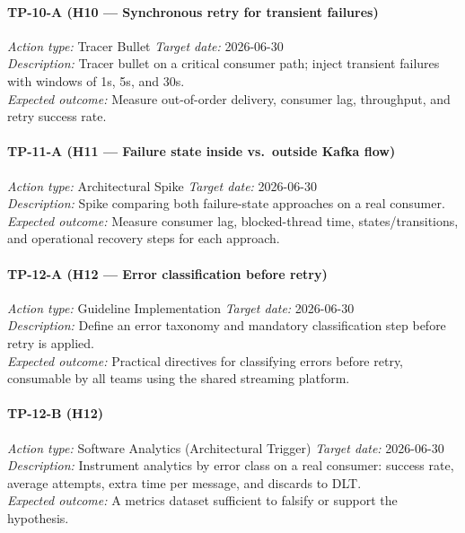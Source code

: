 \paragraph{TP-10-A \textnormal{(H10 — Synchronous retry for transient failures)}}
\textit{Action type:} Tracer Bullet \quad \textit{Target date:} 2026-06-30 \\
\textit{Description:} Tracer bullet on a critical consumer path; inject
transient failures with windows of 1s, 5s, and 30s. \\
\textit{Expected outcome:} Measure out-of-order delivery, consumer lag,
throughput, and retry success rate.

\paragraph{TP-11-A \textnormal{(H11 — Failure state inside vs.\ outside Kafka flow)}}
\textit{Action type:} Architectural Spike \quad \textit{Target date:} 2026-06-30 \\
\textit{Description:} Spike comparing both failure-state approaches on a real
consumer. \\
\textit{Expected outcome:} Measure consumer lag, blocked-thread time,
states/transitions, and operational recovery steps for each approach.

\paragraph{TP-12-A \textnormal{(H12 — Error classification before retry)}}
\textit{Action type:} Guideline Implementation \quad \textit{Target date:} 2026-06-30 \\
\textit{Description:} Define an error taxonomy and mandatory classification step
before retry is applied. \\
\textit{Expected outcome:} Practical directives for classifying errors before
retry, consumable by all teams using the shared streaming platform.

\paragraph{TP-12-B \textnormal{(H12)}}
\textit{Action type:} Software Analytics (Architectural Trigger) \quad \textit{Target date:} 2026-06-30 \\
\textit{Description:} Instrument analytics by error class on a real consumer:
success rate, average attempts, extra time per message, and discards to DLT. \\
\textit{Expected outcome:} A metrics dataset sufficient to falsify or support
the hypothesis.

